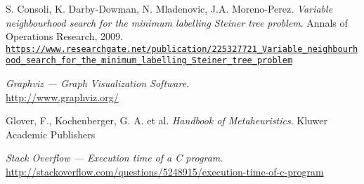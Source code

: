 \documentclass[12pt, a4paper]{article}
\begin{document}
\begin{thebibliography}{9}

S. Consoli, K. Darby-Dowman, N. Mladenovic, J.A. Moreno-Perez.
\textit{Variable neighbourhood search for the minimum labelling Steiner tree
problem}.
Annals of Operations Research, 2009.
\tiny
\\\texttt{\url{https://www.researchgate.net/publication/225327721_Variable_neighbourhood_search_for_the_minimum_labelling_Steiner_tree_problem}}
\normalsize

\textit{Graphviz --- Graph Visualization Software}. \\
\url{http://www.graphviz.org/}

Glover, F., Kochenberger, G. A. et al.
\textit{Handbook of Metaheuristics}.
Kluwer Academic Publishers
\tiny
\normalsize

\textit{Stack Overflow --- Execution time of a C program}. \\
\url{http://stackoverflow.com/questions/5248915/execution-time-of-c-program}

\end{thebibliography}
\end{document}
